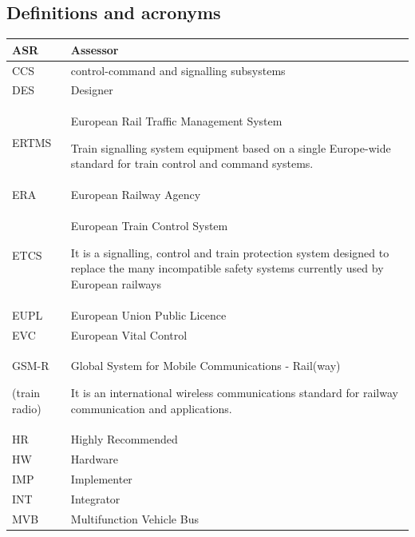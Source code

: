 \documentclass{template/openetcs_article}
\begin{document}
\subsection{Definitions and acronyms}
\tablehead{}
\tabletail{}
\tablelasttail{}
\begin{supertabular}{|m{3cm}m{11cm}|}
\hline
ASR &
Assessor\\\hline
CCS &
control-command and signalling subsystems  \\\hline
DES &
Designer\\\hline
ERTMS &
European Rail Traffic Management System

Train signalling system equipment based on a single Europe-wide standard for train control and command systems.\\\hline
ERA &
European Railway Agency\\\hline
ETCS &
European Train Control System

It is a signalling, control and train protection system designed to replace the many incompatible safety systems currently used by European railways\\\hline
EUPL &
European Union Public Licence\\\hline
EVC &
European Vital Control\\\hline
GSM-R

(train radio) &
Global System for Mobile Communications - Rail(way)

It is an international wireless communications standard for railway communication and applications.\\\hline
HR &
Highly Recommended\\\hline
HW &
Hardware\\\hline
IMP &
Implementer\\\hline
INT &
Integrator\\\hline
MVB &
Multifunction Vehicle Bus


\end{supertabular}
\end{document}

